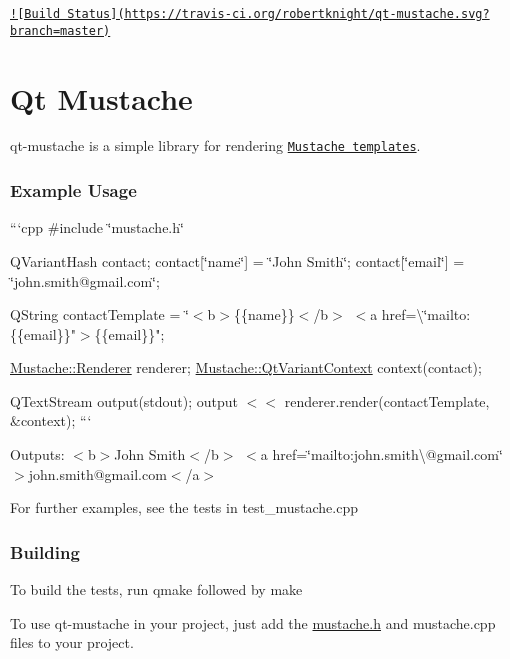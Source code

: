 \href{https://travis-ci.org/robertknight/qt-mustache}{\tt !\mbox{[}Build Status\mbox{]}(https\-://travis-\/ci.\-org/robertknight/qt-\/mustache.\-svg?branch=master)}

\section*{Qt Mustache}

qt-\/mustache is a simple library for rendering \href{http://mustache.github.com/}{\tt Mustache templates}.

\subsubsection*{Example Usage}

```cpp \#include \char`\"{}mustache.\-h\char`\"{}

Q\-Variant\-Hash contact; contact\mbox{[}\char`\"{}name\char`\"{}\mbox{]} = \char`\"{}\-John Smith\char`\"{}; contact\mbox{[}\char`\"{}email\char`\"{}\mbox{]} = \char`\"{}john.\-smith@gmail.\-com\char`\"{};

Q\-String contact\-Template = \char`\"{}$<$b$>$\{\{name\}\}$<$/b$>$ $<$a href=\textbackslash{}\char`\"{}mailto\-:\{\{email\}\}"$>$\{\{email\}\}";

\hyperlink{classMustache_1_1Renderer}{Mustache\-::\-Renderer} renderer; \hyperlink{classMustache_1_1QtVariantContext}{Mustache\-::\-Qt\-Variant\-Context} context(contact);

Q\-Text\-Stream output(stdout); output $<$$<$ renderer.\-render(contact\-Template, \&context); ```

Outputs\-: {\ttfamily $<$b$>$John Smith$<$/b$>$ $<$a href=\char`\"{}mailto\-:john.\-smith\textbackslash{}@gmail.\-com\char`\"{}$>$john.\-smith@gmail.\-com$<$/a$>$}

For further examples, see the tests in {\ttfamily test\-\_\-mustache.\-cpp}

\subsubsection*{Building}


\begin{DoxyItemize}
\item To build the tests, run {\ttfamily qmake} followed by {\ttfamily make}
\item To use qt-\/mustache in your project, just add the {\ttfamily \hyperlink{mustache_8h_source}{mustache.\-h}} and {\ttfamily mustache.\-cpp} files to your project.
\end{DoxyItemize}

